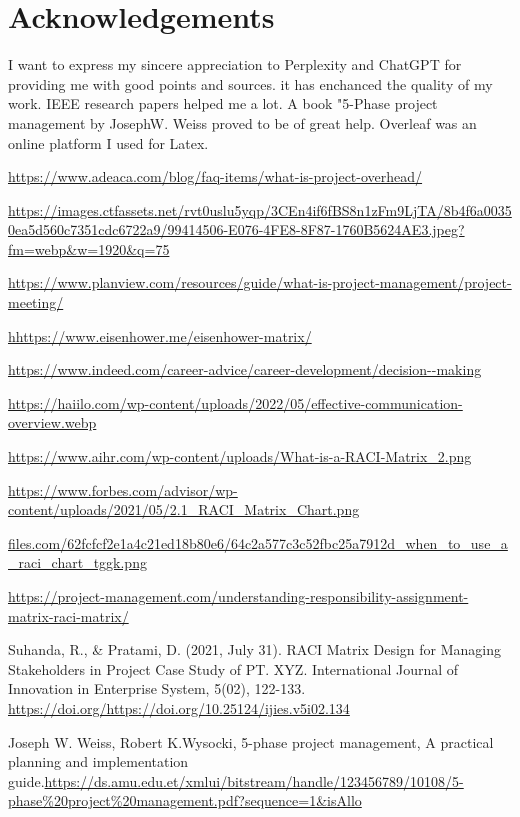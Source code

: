 \documentclass[a4paper,12pt]{article}
\begin{document}
\newpage
\section{Acknowledgements}
I want to express my sincere appreciation to Perplexity and ChatGPT for providing me with good points and sources. it has enchanced the quality of my work. IEEE research papers helped me a lot. A book "5-Phase project management by JosephW. Weiss proved to be of great help. Overleaf was an online platform I used for Latex.


\newpage
{}
\vspace*{-35pt}
\renewcommand{\refname}{References}
\begin{thebibliography}{99}

 \url{https://www.adeaca.com/blog/faq-items/what-is-project-overhead/}


\url{https://images.ctfassets.net/rvt0uslu5yqp/3CEn4if6fBS8n1zFm9LjTA/8b4f6a00350ea5d560c7351cdc6722a9/99414506-E076-4FE8-8F87-1760B5624AE3.jpeg?fm=webp&w=1920&q=75}

 \url{https://www.planview.com/resources/guide/what-is-project-management/project-meeting/}

 \url{hhttps://www.eisenhower.me/eisenhower-matrix/}

 \url{https://www.indeed.com/career-advice/career-development/decision--making}

 \url{https://haiilo.com/wp-content/uploads/2022/05/effective-communication-overview.webp}


 \url{https://www.aihr.com/wp-content/uploads/What-is-a-RACI-Matrix_2.png}

 
 \url{https://www.forbes.com/advisor/wp-content/uploads/2021/05/2.1_RACI_Matrix_Chart.png}


\url{files.com/62fcfcf2e1a4c21ed18b80e6/64c2a577c3c52fbc25a7912d_when_to_use_a_raci_chart_tggk.png}


 \url{https://project-management.com/understanding-responsibility-assignment-matrix-raci-matrix/}






Suhanda, R., & Pratami, D. (2021, July 31). RACI Matrix Design for Managing Stakeholders in Project Case Study of PT. XYZ. International Journal of Innovation in Enterprise System, 5(02), 122-133. \url{https://doi.org/https://doi.org/10.25124/ijies.v5i02.134}

\bibitem{}
Joseph W. Weiss, Robert K.Wysocki, 5-phase project management, A practical planning and implementation guide.\url{https://ds.amu.edu.et/xmlui/bitstream/handle/123456789/10108/5-phase%20project%20management.pdf?sequence=1&isAllo}


\end{thebibliography}
\end{document}
